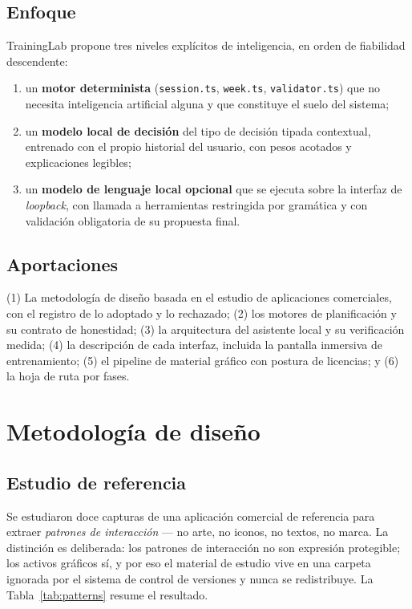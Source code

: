 \documentclass[conference]{IEEEtran}
\newcommand{\code}[1]{\texttt{\small #1}}
\begin{document}
\subsection{Enfoque}
TrainingLab propone tres niveles expl\'icitos de inteligencia, en orden de
fiabilidad descendente:

\begin{enumerate}
  \item un \textbf{motor determinista} (\code{session.ts}, \code{week.ts},
  \code{validator.ts}) que no necesita inteligencia artificial alguna y que
  constituye el suelo del sistema;
  \item un \textbf{modelo local de decisi\'on} del tipo de decisi\'on tipada
  contextual, entrenado con el propio historial del usuario, con pesos acotados
  y explicaciones legibles;
  \item un \textbf{modelo de lenguaje local opcional} que se ejecuta sobre la
  interfaz de \emph{loopback}, con llamada a herramientas restringida por
  gram\'atica y con validaci\'on obligatoria de su propuesta final.
\end{enumerate}

\subsection{Aportaciones}
(1) La metodolog\'ia de dise\~no basada en el estudio de aplicaciones
comerciales, con el registro de lo adoptado y lo rechazado; (2) los motores de
planificaci\'on y su contrato de honestidad; (3) la arquitectura del asistente
local y su verificaci\'on medida; (4) la descripci\'on de cada interfaz,
incluida la pantalla inmersiva de entrenamiento; (5) el pipeline de material
gr\'afico con postura de licencias; y (6) la hoja de ruta por fases.

\section{Metodolog\'ia de dise\~no}

\subsection{Estudio de referencia}
Se estudiaron doce capturas de una aplicaci\'on comercial de referencia para
extraer \emph{patrones de interacci\'on} --- no arte, no iconos, no textos, no
marca. La distinci\'on es deliberada: los patrones de interacci\'on no son
expresi\'on protegible; los activos gr\'aficos s\'i, y por eso el material de
estudio vive en una carpeta ignorada por el sistema de control de versiones y
nunca se redistribuye. La Tabla~\ref{tab:patterns} resume el resultado.
\end{document}
